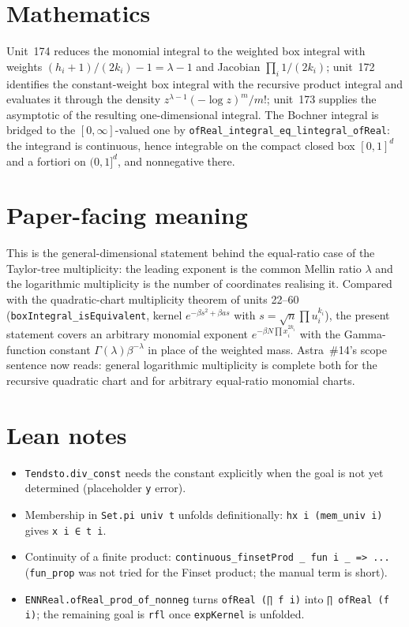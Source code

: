 \documentclass[11pt]{article}
\begin{document}
\section{Mathematics}
Unit~174 reduces the monomial integral to the weighted box integral with weights
$(h_i+1)/(2k_i)-1=\lambda-1$ and Jacobian $\prod_i1/(2k_i)$; unit~172 identifies the constant-weight
box integral with the recursive product integral and evaluates it through the density
$z^{\lambda-1}(-\log z)^m/m!$; unit~173 supplies the asymptotic of the resulting one-dimensional
integral. The Bochner integral is bridged to the $[0,\infty]$-valued one by
\texttt{ofReal\_integral\_eq\_lintegral\_ofReal}: the integrand is continuous, hence integrable on
the compact closed box $[0,1]^d$ and a fortiori on $(0,1]^d$, and nonnegative there.

\section{Paper-facing meaning}
This is the general-dimensional statement behind the equal-ratio case of the Taylor-tree
multiplicity: the leading exponent is the common Mellin ratio $\lambda$ and the logarithmic
multiplicity is the number of coordinates realising it. Compared with the quadratic-chart
multiplicity theorem of units 22--60 (\texttt{boxIntegral\_isEquivalent}, kernel
$e^{-\beta s^2+\beta as}$ with $s=\sqrt n\prod u_i^{k_i}$), the present statement covers an
arbitrary monomial exponent $e^{-\beta N\prod x_i^{2k_i}}$ with the Gamma-function constant
$\Gamma(\lambda)\beta^{-\lambda}$ in place of the weighted mass. Astra~\#14's scope sentence now
reads: general logarithmic multiplicity is complete both for the recursive quadratic chart and for
arbitrary equal-ratio monomial charts.

\section{Lean notes}
\begin{itemize}
\item \texttt{Tendsto.div\_const} needs the constant explicitly when the goal is not yet
determined (placeholder \texttt{y} error).
\item Membership in \texttt{Set.pi univ t} unfolds definitionally: \texttt{hx i (mem\_univ i)}
gives \texttt{x i ∈ t i}.
\item Continuity of a finite product: \texttt{continuous\_finsetProd \_ fun i \_ => ...}
(\texttt{fun\_prop} was not tried for the Finset product; the manual term is short).
\item \texttt{ENNReal.ofReal\_prod\_of\_nonneg} turns \texttt{ofReal (∏ f i)} into
\texttt{∏ ofReal (f i)}; the remaining goal is \texttt{rfl} once \texttt{expKernel} is unfolded.
\end{itemize}
\end{document}
